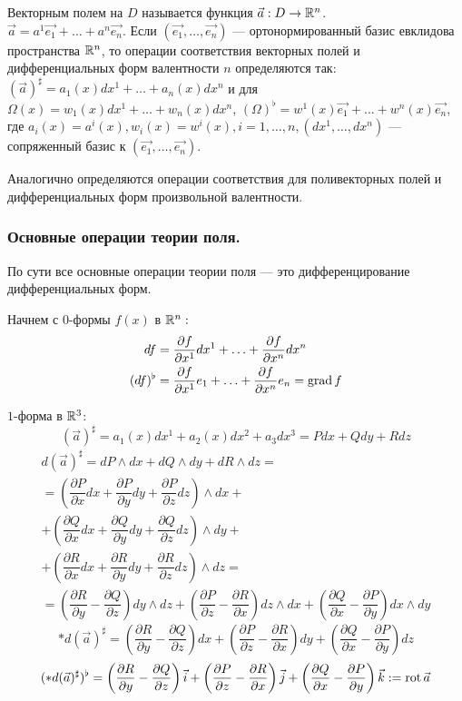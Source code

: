 \begin{Def}
	Векторным полем на $D$ называется функция $\vec{a}: D\to\R^n$.\\ $\vec{a}=a^1\vec{e_1}+\ldots+a^n\vec{e_n}$.
	Если $(\vec{e_1}, \ldots, \vec{e_n})$ --- ортонормированный базис евклидова пространства $\mathbb{R}^n$, то операции соответствия векторных полей и дифференциальных форм валентности $n$ определяются так: $(\vec{a})^\sharp=a_1(x)dx^1+\ldots+a_n(x)dx^n$ и для $\Omega(x)=w_1(x)dx^1+\ldots+w_n(x)dx^n$, $(\Omega)^\flat=w^1(x)\vec{e_1}+\ldots+w^n(x)\vec{e_n}$, где $a_i(x)=a^i(x), w_i(x)=w^i(x), i=1,\ldots, n, (dx^1, \ldots, dx^n)$ --- сопряженный базис к $(\vec{e_1}, \ldots, \vec{e_n})$.
	
	Аналогично определяются операции соответствия для поливекторных полей и дифференциальных форм произвольной валентности.
\end{Def}

\subsubsection{Основные операции теории поля.}
По сути все основные операции теории поля --- это дифференцирование дифференциальных форм.

Начнем с $0$-формы $f(x)$ в $\mathbb{R}^n:$
\begin{align*}
	df&=\dfrac{\partial f}{\partial x^1}dx^1+\ldots+\dfrac{\partial f}{\partial x^n}dx^n \\
	(df)^\flat&= \dfrac{\partial f}{\partial x^1}e_1+\ldots+\dfrac{\partial f}{\partial x^n}e_n=\operatorname{grad} f
\end{align*}

$1$-форма в $\mathbb{R}^3$:
$$
	(\vec{a})^\sharp= a_1(x)dx^1+a_2(x)dx^2+a_3dx^3=Pdx+Qdy+Rdz
$$
\begin{multline*}
	d(\vec{a})^\sharp=dP\wedge dx+dQ\wedge dy+dR\wedge dz=
	\\
	=\left(\dfrac{\partial P}{\partial x}dx+\dfrac{\partial P}{\partial y}dy+\dfrac{\partial P}{\partial z}dz \right)\wedge dx+\\+\left(\dfrac{\partial Q}{\partial x}dx+\dfrac{\partial Q}{\partial y}dy+\dfrac{\partial Q}{\partial z}dz \right)\wedge dy+\\+\left(\dfrac{\partial R}{\partial x}dx+\dfrac{\partial R}{\partial y}dy+\dfrac{\partial R}{\partial z}dz \right)\wedge dz=
	\\
	=\left(\dfrac{\partial R}{\partial y}-\dfrac{\partial Q}{\partial z}\right)dy\wedge dz+\left(\dfrac{\partial P}{\partial z}-\dfrac{\partial R}{\partial x}\right)dz\wedge dx+\left(\dfrac{\partial Q}{\partial x}-\dfrac{\partial P}{\partial y}\right)dx\wedge dy
\end{multline*}
$$*d(\vec{a})^\sharp = \left(\dfrac{\partial R}{\partial y}-\dfrac{\partial Q}{\partial z}\right)dx+\left(\dfrac{\partial P}{\partial z}-\dfrac{\partial R}{\partial x}\right)dy+\left(\dfrac{\partial Q}{\partial x}-\dfrac{\partial P}{\partial y}\right)dz$$
$$(*d(\vec{a})^\sharp)^\flat = \left(\dfrac{\partial R}{\partial y}-\dfrac{\partial Q}{\partial z}\right)\vec{i}+\left(\dfrac{\partial P}{\partial z}-\dfrac{\partial R}{\partial x}\right)\vec{j}+\left(\dfrac{\partial Q}{\partial x}-\dfrac{\partial P}{\partial y}\right)\vec{k}:=\operatorname{rot}\vec{a}$$

